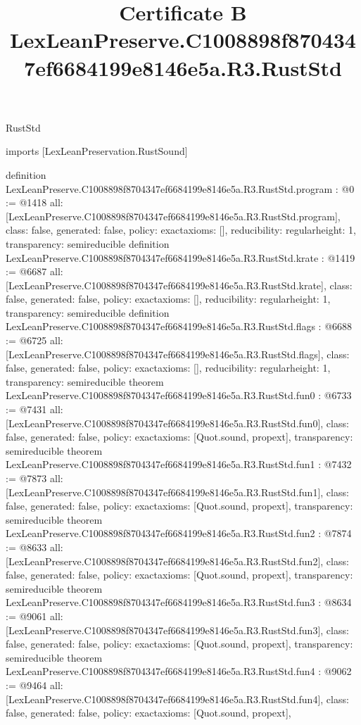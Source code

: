 \begin{lexlean}{RustStd}
\title{Certificate B LexLeanPreserve.C1008898f8704347ef6684199e8146e5a.R3.RustStd}
\begin{coremodule}
imports [LexLeanPreservation.RustSound]

definition LexLeanPreserve.C1008898f8704347ef6684199e8146e5a.R3.RustStd.program : @0 := @1418 {
  all: [LexLeanPreserve.C1008898f8704347ef6684199e8146e5a.R3.RustStd.program],
  class: false,
  generated: false,
  policy: exact{axioms: []},
  reducibility: regular{height: 1},
  transparency: semireducible
}
definition LexLeanPreserve.C1008898f8704347ef6684199e8146e5a.R3.RustStd.krate : @1419 := @6687 {
  all: [LexLeanPreserve.C1008898f8704347ef6684199e8146e5a.R3.RustStd.krate],
  class: false,
  generated: false,
  policy: exact{axioms: []},
  reducibility: regular{height: 1},
  transparency: semireducible
}
definition LexLeanPreserve.C1008898f8704347ef6684199e8146e5a.R3.RustStd.flags : @6688 := @6725 {
  all: [LexLeanPreserve.C1008898f8704347ef6684199e8146e5a.R3.RustStd.flags],
  class: false,
  generated: false,
  policy: exact{axioms: []},
  reducibility: regular{height: 1},
  transparency: semireducible
}
theorem LexLeanPreserve.C1008898f8704347ef6684199e8146e5a.R3.RustStd.fun0 : @6733 := @7431 {
  all: [LexLeanPreserve.C1008898f8704347ef6684199e8146e5a.R3.RustStd.fun0],
  class: false,
  generated: false,
  policy: exact{axioms: [Quot.sound, propext]},
  transparency: semireducible
}
theorem LexLeanPreserve.C1008898f8704347ef6684199e8146e5a.R3.RustStd.fun1 : @7432 := @7873 {
  all: [LexLeanPreserve.C1008898f8704347ef6684199e8146e5a.R3.RustStd.fun1],
  class: false,
  generated: false,
  policy: exact{axioms: [Quot.sound, propext]},
  transparency: semireducible
}
theorem LexLeanPreserve.C1008898f8704347ef6684199e8146e5a.R3.RustStd.fun2 : @7874 := @8633 {
  all: [LexLeanPreserve.C1008898f8704347ef6684199e8146e5a.R3.RustStd.fun2],
  class: false,
  generated: false,
  policy: exact{axioms: [Quot.sound, propext]},
  transparency: semireducible
}
theorem LexLeanPreserve.C1008898f8704347ef6684199e8146e5a.R3.RustStd.fun3 : @8634 := @9061 {
  all: [LexLeanPreserve.C1008898f8704347ef6684199e8146e5a.R3.RustStd.fun3],
  class: false,
  generated: false,
  policy: exact{axioms: [Quot.sound, propext]},
  transparency: semireducible
}
theorem LexLeanPreserve.C1008898f8704347ef6684199e8146e5a.R3.RustStd.fun4 : @9062 := @9464 {
  all: [LexLeanPreserve.C1008898f8704347ef6684199e8146e5a.R3.RustStd.fun4],
  class: false,
  generated: false,
  policy: exact{axioms: [Quot.sound, propext]},
}
\end{coremodule}
\end{lexlean}
